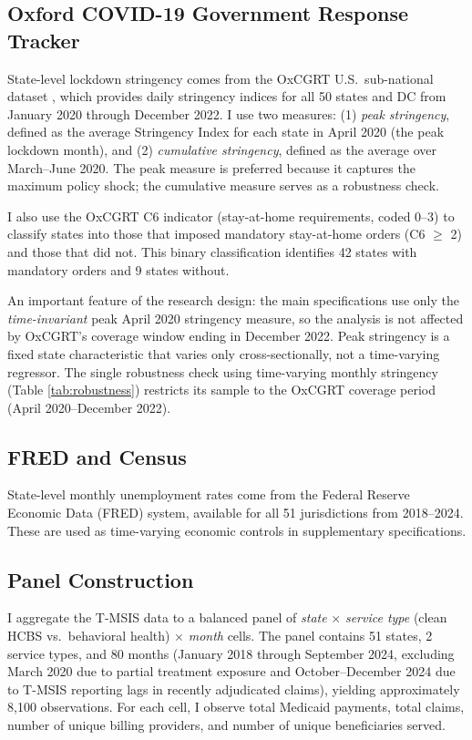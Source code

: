 \documentclass[12pt]{article}
\begin{document}
\subsection{Oxford COVID-19 Government Response Tracker}

State-level lockdown stringency comes from the OxCGRT U.S.\ sub-national dataset \citep{hale2021global}, which provides daily stringency indices for all 50 states and DC from January 2020 through December 2022. I use two measures: (1) \textit{peak stringency}, defined as the average Stringency Index for each state in April 2020 (the peak lockdown month), and (2) \textit{cumulative stringency}, defined as the average over March--June 2020. The peak measure is preferred because it captures the maximum policy shock; the cumulative measure serves as a robustness check.

I also use the OxCGRT C6 indicator (stay-at-home requirements, coded 0--3) to classify states into those that imposed mandatory stay-at-home orders (C6 $\geq$ 2) and those that did not. This binary classification identifies 42 states with mandatory orders and 9 states without.

An important feature of the research design: the main specifications use only the \textit{time-invariant} peak April 2020 stringency measure, so the analysis is not affected by OxCGRT's coverage window ending in December 2022. Peak stringency is a fixed state characteristic that varies only cross-sectionally, not a time-varying regressor. The single robustness check using time-varying monthly stringency (Table \ref{tab:robustness}) restricts its sample to the OxCGRT coverage period (April 2020--December 2022).

\subsection{FRED and Census}

State-level monthly unemployment rates come from the Federal Reserve Economic Data (FRED) system, available for all 51 jurisdictions from 2018--2024. These are used as time-varying economic controls in supplementary specifications.

\subsection{Panel Construction}

I aggregate the T-MSIS data to a balanced panel of \textit{state} $\times$ \textit{service type} (clean HCBS vs.\ behavioral health) $\times$ \textit{month} cells. The panel contains 51 states, 2 service types, and 80 months (January 2018 through September 2024, excluding March 2020 due to partial treatment exposure and October--December 2024 due to T-MSIS reporting lags in recently adjudicated claims), yielding approximately 8,100 observations. For each cell, I observe total Medicaid payments, total claims, number of unique billing providers, and number of unique beneficiaries served.
\end{document}
